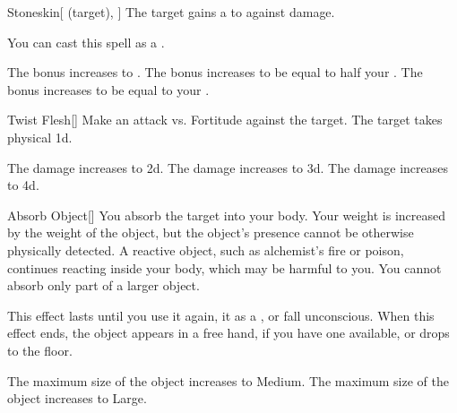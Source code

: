 \lowercase{\hypertarget{spell:Stoneskin}{}}\label{spell:Stoneskin}
\begin{attuneability}[Rank 1]{\hypertarget{spell:Stoneskin}{Stoneskin}}[ (target), ]
The target gains a   to  against  damage.

You can cast this spell as a .

\rankline
{} The bonus increases to .
 The bonus increases to be equal to half your .
 The bonus increases to be equal to your .
\end{attuneability}
\vspace{0.25em}



\lowercase{\hypertarget{spell:Twist Flesh}{}}\label{spell:Twist Flesh}
\begin{freeability}[Rank 1]{\hypertarget{spell:Twist Flesh}{Twist Flesh}}[]
Make an attack vs. Fortitude against the target.
\hit The target takes physical  \plus1d.

\rankline
{} The damage increases to  \plus2d.
 The damage increases to  \plus3d.
 The damage increases to  \plus4d.
\end{freeability}
\vspace{0.25em}



\lowercase{\hypertarget{spell:Absorb Object}{}}\label{spell:Absorb Object}
\begin{freeability}[Rank 3]{\hypertarget{spell:Absorb Object}{Absorb Object}}[]
You absorb the target into your body.
Your weight is increased by the weight of the object, but the object's presence cannot be otherwise physically detected.
A reactive object, such as alchemist's fire or poison, continues reacting inside your body, which may be harmful to you.
You cannot absorb only part of a larger object.

This effect lasts until you use it again,  it as a , or fall unconscious.
When this effect ends, the object appears in a free hand, if you have one available, or drops to the floor.

\rankline
{} The maximum size of the object increases to Medium.
 The maximum size of the object increases to Large.
\end{freeability}
\vspace{0.25em}



